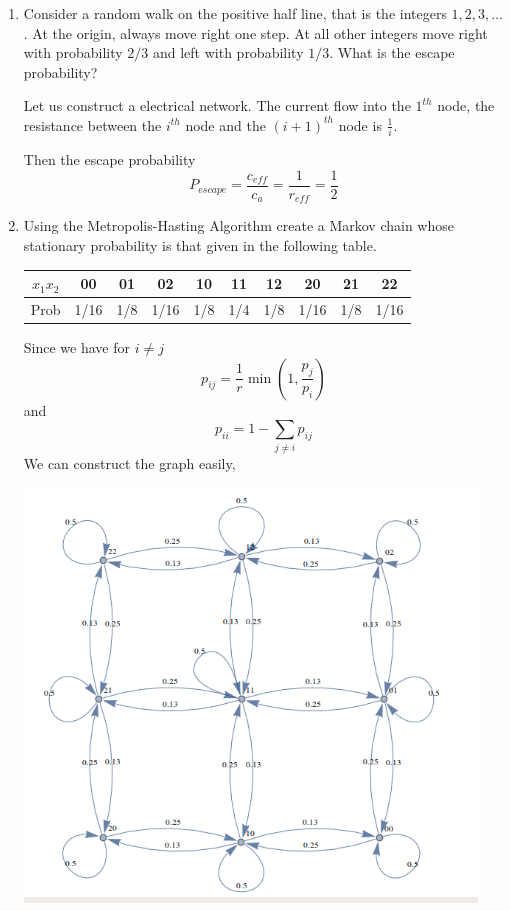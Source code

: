 \documentclass[a4paper, 12pt]{mcshw}
\begin{document}
\begin{enumerate}
    \item Consider a random walk on the positive half line, that is the integers $1, 2, 3, \dots$. At the origin, always move right one step. At all other integers move right with probability $2/3$ and left with probability $1/3$. What is the escape probability?
        \begin{solution}
            Let us construct a electrical network. The current flow into the $1^{th}$ node, the resistance between the $i^{th}$ node and the $(i + 1)^{th}$ node is $\frac{1}{i}$. 
            
            Then the escape probability
            $$P_{escape} = \frac{c_{eff}}{c_a} = \frac{1}{r_{eff}} = \frac{1}{2}$$
        \end{solution}
    \item Using the Metropolis-Hasting Algorithm create a Markov chain whose stationary probability is that given in the following table.
        \begin{center}
            \begin{tabular}{|c|c|c|c|c|c|c|c|c|c|}
                \hline
                $x_1x_2$ & 00 & 01 & 02 & 10 & 11 & 12 & 20 & 21 & 22\\
                \hline
                Prob & 1/16 & 1/8 & 1/16 & 1/8 & 1/4 & 1/8 & 1/16 & 1/8 & 1/16\\
                \hline
            \end{tabular}
        \end{center}
        \begin{solution}
            Since we have for $i \neq j$
            $$p_{ij} = \frac{1}{r}\min(1, \frac{p_j}{p_i})$$
            and
            $$p_{ii} = 1 - \sum_{j \neq i}p_{ij}$$
            We can construct the graph easily, 
            \begin{center}
                \includegraphics[height=11cm]{1.png}
            \end{center}
        \end{solution}
\end{enumerate}
\end{document}
